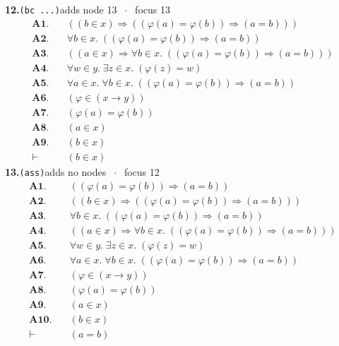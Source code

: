 \documentclass[11pt]{article}
\begin{document}
\medskip\noindent\textbf{12.}\quad \texttt{(bc ...)}\hfill{\small adds node 13 $\;\cdot\;$ focus 13}\\[2pt]
\begin{align*}
  \mathbf{A1.}\quad & ((b \in x) \Rightarrow ((\varphi(a) = \varphi(b)) \Rightarrow (a = b))) \\
  \mathbf{A2.}\quad & \forall b \in x.\; ((\varphi(a) = \varphi(b)) \Rightarrow (a = b)) \\
  \mathbf{A3.}\quad & ((a \in x) \Rightarrow \forall b \in x.\; ((\varphi(a) = \varphi(b)) \Rightarrow (a = b))) \\
  \mathbf{A4.}\quad & \forall w \in y.\; \exists z \in x.\; (\varphi(z) = w) \\
  \mathbf{A5.}\quad & \forall a \in x.\; \forall b \in x.\; ((\varphi(a) = \varphi(b)) \Rightarrow (a = b)) \\
  \mathbf{A6.}\quad & (\varphi \in (x \to y)) \\
  \mathbf{A7.}\quad & (\varphi(a) = \varphi(b)) \\
  \mathbf{A8.}\quad & (a \in x) \\
  \mathbf{A9.}\quad & (b \in x) \\
  \vdash\quad & (b \in x)
\end{align*}
\medskip\noindent\textbf{13.}\quad \texttt{(ass)}\hfill{\small adds no nodes $\;\cdot\;$ focus 12}\\[2pt]
\begin{align*}
  \mathbf{A1.}\quad & ((\varphi(a) = \varphi(b)) \Rightarrow (a = b)) \\
  \mathbf{A2.}\quad & ((b \in x) \Rightarrow ((\varphi(a) = \varphi(b)) \Rightarrow (a = b))) \\
  \mathbf{A3.}\quad & \forall b \in x.\; ((\varphi(a) = \varphi(b)) \Rightarrow (a = b)) \\
  \mathbf{A4.}\quad & ((a \in x) \Rightarrow \forall b \in x.\; ((\varphi(a) = \varphi(b)) \Rightarrow (a = b))) \\
  \mathbf{A5.}\quad & \forall w \in y.\; \exists z \in x.\; (\varphi(z) = w) \\
  \mathbf{A6.}\quad & \forall a \in x.\; \forall b \in x.\; ((\varphi(a) = \varphi(b)) \Rightarrow (a = b)) \\
  \mathbf{A7.}\quad & (\varphi \in (x \to y)) \\
  \mathbf{A8.}\quad & (\varphi(a) = \varphi(b)) \\
  \mathbf{A9.}\quad & (a \in x) \\
  \mathbf{A10.}\quad & (b \in x) \\
  \vdash\quad & (a = b)
\end{align*}
\end{document}

